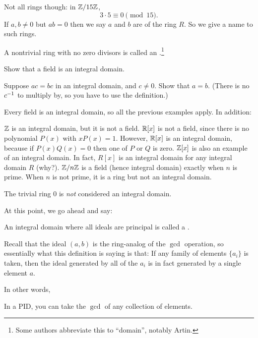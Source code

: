 Not all rings though: in $\mathbb Z/15\mathbb Z$,
\[ 3 \cdot 5 \equiv 0 \pmod{15}. \]
If $a, b \neq 0$ but $ab=0$ then we say $a$ and $b$ are 
of the ring $R$.
So we give a name to such rings.
\begin{definition}
	A nontrivial ring with no zero divisors
	is called an .\footnote{Some
		authors abbreviate this to ``domain'', notably Artin.}
\end{definition}
\begin{ques}
	Show that a field is an integral domain.
\end{ques}
\begin{exercise}
	Suppose $ac = bc$ in an integral domain, and $c \neq 0$.
	Show that $a = b$.
	(There is no $c^{-1}$ to multiply by,
	so you have to use the definition.)
\end{exercise}

\begin{example}
	Every field is an integral domain,
	so all the previous examples apply.
	In addition:
	\begin{enumerate}[(a)]
		\ii $\mathbb Z$ is an integral domain, but it is not a field.
		\ii $\mathbb R[x]$ is not a field,
		since there is no polynomial $P(x)$ with $xP(x) = 1$.
		However, $\mathbb R[x]$ is an integral domain,
		because if $P(x) Q(x) = 0$ then one of $P$ or $Q$ is zero.
		\ii $\mathbb Z[x]$ is also an example of an integral domain.
		In fact, $R[x]$ is an integral domain for any integral domain $R$ (why?).
		\ii $\mathbb Z/n\mathbb Z$ is a field (hence integral domain)
		exactly when $n$ is prime.
		When $n$ is not prime, it is a ring but not an integral domain.
	\end{enumerate}
	The trivial ring $0$ is \emph{not} considered an integral domain.
\end{example}

At this point, we go ahead and say:
\begin{definition}
	An integral domain where all ideals are principal
	is called a .
\end{definition}

Recall that the ideal $(a, b)$ is the ring-analog of the $\gcd$ operation, so essentially what this
definition is saying is that:
If any family of elements $\{ a_i \}$ is taken, then the ideal generated by all of the $a_i$ is in
fact generated by a single element $a$.

In other words,
\begin{moral}
	In a PID, you can take the $\gcd$ of any collection of elements.
\end{moral}

